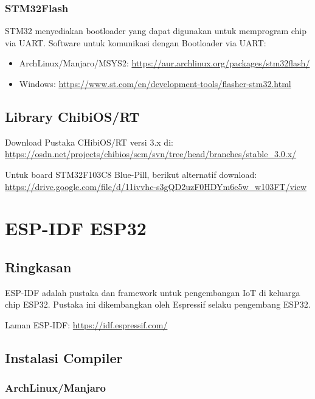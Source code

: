 \documentclass[12pt]{book}
\begin{document}
	\subsection{STM32Flash}
	
	STM32 menyediakan bootloader yang dapat digunakan untuk memprogram chip via UART.
	Software untuk komunikasi dengan Bootloader via UART:
	
	\begin{itemize}
		\item ArchLinux/Manjaro/MSYS2: \url{https://aur.archlinux.org/packages/stm32flash/}
		
		\item Windows: \url{https://www.st.com/en/development-tools/flasher-stm32.html}
	\end{itemize}
	
	\newpage
	\section{Library ChibiOS/RT}
	
	Download Pustaka CHibiOS/RT versi 3.x di: \url{https://osdn.net/projects/chibios/scm/svn/tree/head/branches/stable_3.0.x/}
	
	Untuk board STM32F103C8 Blue-Pill, berikut alternatif download: \url{https://drive.google.com/file/d/11ivvhc-s3gQD2uzF0HDYm6e5w_w103FT/view}
	
	
	\chapter{ESP-IDF ESP32}
	
	\section{Ringkasan}
	
	ESP-IDF adalah pustaka dan framework untuk pengembangan IoT di keluarga chip ESP32.
	Pustaka ini dikembangkan oleh Espressif selaku pengembang ESP32.
	
	Laman ESP-IDF: \url{https://idf.espressif.com/}
	
	\section{Instalasi Compiler}
	
	\subsection{ArchLinux/Manjaro}
	
\end{document}
